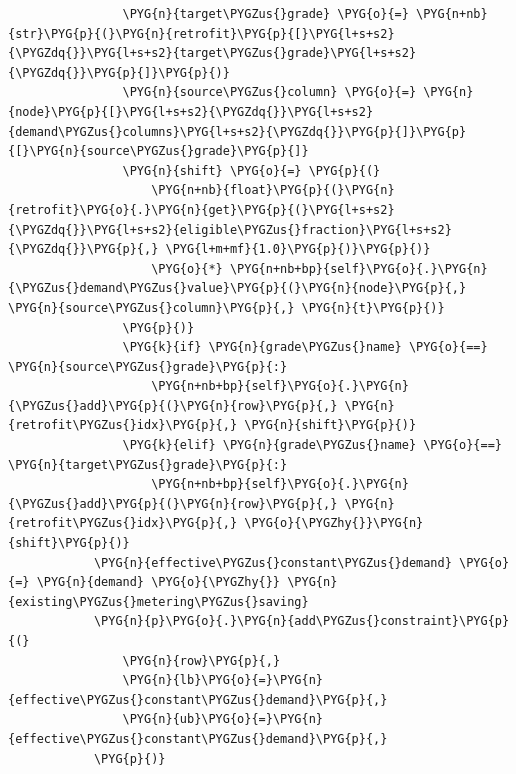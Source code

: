 \begin{Verbatim}
                \PYG{n}{target\PYGZus{}grade} \PYG{o}{=} \PYG{n+nb}{str}\PYG{p}{(}\PYG{n}{retrofit}\PYG{p}{[}\PYG{l+s+s2}{\PYGZdq{}}\PYG{l+s+s2}{target\PYGZus{}grade}\PYG{l+s+s2}{\PYGZdq{}}\PYG{p}{]}\PYG{p}{)}
                \PYG{n}{source\PYGZus{}column} \PYG{o}{=} \PYG{n}{node}\PYG{p}{[}\PYG{l+s+s2}{\PYGZdq{}}\PYG{l+s+s2}{demand\PYGZus{}columns}\PYG{l+s+s2}{\PYGZdq{}}\PYG{p}{]}\PYG{p}{[}\PYG{n}{source\PYGZus{}grade}\PYG{p}{]}
                \PYG{n}{shift} \PYG{o}{=} \PYG{p}{(}
                    \PYG{n+nb}{float}\PYG{p}{(}\PYG{n}{retrofit}\PYG{o}{.}\PYG{n}{get}\PYG{p}{(}\PYG{l+s+s2}{\PYGZdq{}}\PYG{l+s+s2}{eligible\PYGZus{}fraction}\PYG{l+s+s2}{\PYGZdq{}}\PYG{p}{,} \PYG{l+m+mf}{1.0}\PYG{p}{)}\PYG{p}{)}
                    \PYG{o}{*} \PYG{n+nb+bp}{self}\PYG{o}{.}\PYG{n}{\PYGZus{}demand\PYGZus{}value}\PYG{p}{(}\PYG{n}{node}\PYG{p}{,} \PYG{n}{source\PYGZus{}column}\PYG{p}{,} \PYG{n}{t}\PYG{p}{)}
                \PYG{p}{)}
                \PYG{k}{if} \PYG{n}{grade\PYGZus{}name} \PYG{o}{==} \PYG{n}{source\PYGZus{}grade}\PYG{p}{:}
                    \PYG{n+nb+bp}{self}\PYG{o}{.}\PYG{n}{\PYGZus{}add}\PYG{p}{(}\PYG{n}{row}\PYG{p}{,} \PYG{n}{retrofit\PYGZus{}idx}\PYG{p}{,} \PYG{n}{shift}\PYG{p}{)}
                \PYG{k}{elif} \PYG{n}{grade\PYGZus{}name} \PYG{o}{==} \PYG{n}{target\PYGZus{}grade}\PYG{p}{:}
                    \PYG{n+nb+bp}{self}\PYG{o}{.}\PYG{n}{\PYGZus{}add}\PYG{p}{(}\PYG{n}{row}\PYG{p}{,} \PYG{n}{retrofit\PYGZus{}idx}\PYG{p}{,} \PYG{o}{\PYGZhy{}}\PYG{n}{shift}\PYG{p}{)}
            \PYG{n}{effective\PYGZus{}constant\PYGZus{}demand} \PYG{o}{=} \PYG{n}{demand} \PYG{o}{\PYGZhy{}} \PYG{n}{existing\PYGZus{}metering\PYGZus{}saving}
            \PYG{n}{p}\PYG{o}{.}\PYG{n}{add\PYGZus{}constraint}\PYG{p}{(}
                \PYG{n}{row}\PYG{p}{,}
                \PYG{n}{lb}\PYG{o}{=}\PYG{n}{effective\PYGZus{}constant\PYGZus{}demand}\PYG{p}{,}
                \PYG{n}{ub}\PYG{o}{=}\PYG{n}{effective\PYGZus{}constant\PYGZus{}demand}\PYG{p}{,}
            \PYG{p}{)}
\end{Verbatim}
